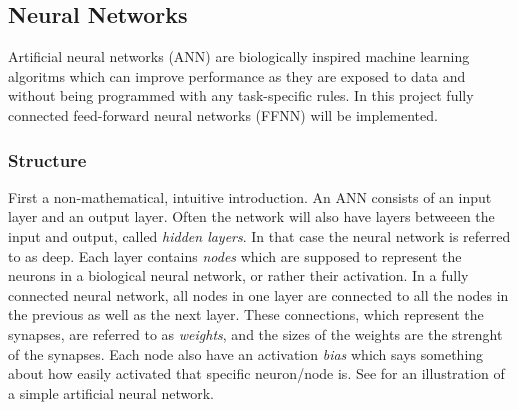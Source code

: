     \subsection{Neural Networks}
        Artificial neural networks (ANN) are biologically inspired machine learning algoritms which can improve performance as they are exposed to data and without being programmed with any task-specific rules. In this project fully connected feed-forward neural networks (FFNN) will be implemented. 
        \subsubsection{Structure}
        First a non-mathematical, intuitive introduction. 
        An ANN consists of an input layer and an output layer. Often the network will also have layers betweeen the input and output, called \textit{hidden layers}. In that case the neural network is referred to as deep. Each layer contains \textit{nodes} which are supposed to represent the neurons in a biological neural network, or rather their activation. In a fully connected neural network, all nodes in one layer are connected to all the nodes in the previous as well as the next layer. These connections, which represent the synapses, are referred to as \textit{weights}, and the sizes of the weights are the strenght of the synapses. Each node also have an activation \textit{bias} which says something about how easily activated that specific neuron/node is. See  for an illustration of a simple artificial neural network. 

